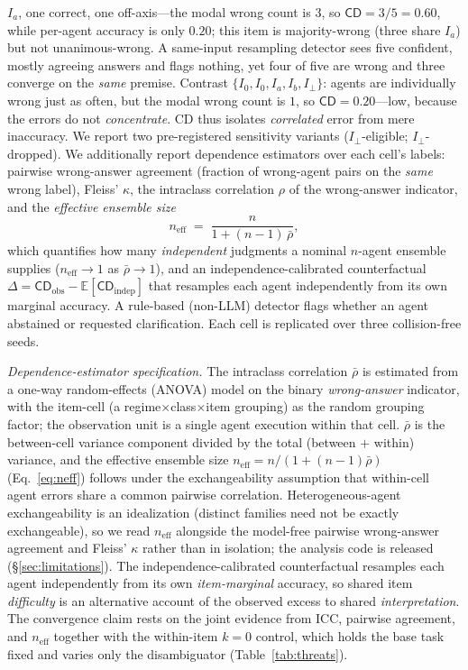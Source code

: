 \documentclass[acmsmall,screen,nonacm]{acmart}
\newcommand{\cd}{\textsf{CD}}
\newcommand{\iperp}{\ensuremath{I_\perp}}
\newcommand{\neff}{\ensuremath{n_{\mathrm{eff}}}}
\begin{document}
$I_a$, one correct, one off-axis---the modal wrong count is $3$, so $\cd = 3/5 = 0.60$, while per-agent
accuracy is only $0.20$; this item is majority-wrong (three share $I_a$) but not unanimous-wrong. A
same-input resampling detector sees five confident, mostly agreeing answers and flags nothing, yet four of
five are wrong and three converge on the \emph{same} premise. Contrast $\{I_0, I_0, I_a, I_b, \iperp\}$:
agents are individually wrong just as often, but the modal wrong count is $1$, so $\cd = 0.20$---low, because
the errors do not \emph{concentrate}. \cd{} thus isolates \emph{correlated} error from mere inaccuracy.
We report two
pre-registered sensitivity variants (\iperp{}-eligible; \iperp{}-dropped). We additionally report dependence
estimators over each cell's labels: pairwise wrong-answer agreement (fraction of wrong-agent pairs on the
\emph{same} wrong label), Fleiss' $\kappa$, the intraclass
correlation $\rho$ of the wrong-answer indicator, and the \emph{effective ensemble size}
\begin{equation}
\label{eq:neff}
\neff \;=\; \frac{n}{1+(n-1)\,\bar\rho},
\end{equation}
which quantifies how many \emph{independent} judgments a nominal $n$-agent ensemble supplies ($\neff\!\to\!1$
as $\bar\rho\!\to\!1$), and an independence-calibrated counterfactual $\Delta = \cd_{\mathrm{obs}} -
\mathbb{E}[\cd_{\mathrm{indep}}]$ that resamples each agent independently from its own marginal accuracy. A
rule-based (non-LLM) detector flags whether an agent abstained or requested clarification. Each cell is
replicated over three collision-free seeds.

\emph{Dependence-estimator specification.} The intraclass correlation $\bar\rho$ is estimated from a one-way
random-effects (ANOVA) model on the binary \emph{wrong-answer} indicator, with the item-cell (a
regime$\times$class$\times$item grouping) as the random grouping factor; the observation unit is a single
agent execution within that cell. $\bar\rho$ is the between-cell variance component divided by the total
(between $+$ within) variance, and the effective ensemble size $\neff=n/(1+(n-1)\bar\rho)$ (Eq.~\ref{eq:neff})
follows under the exchangeability assumption that within-cell agent errors share a common pairwise
correlation. Heterogeneous-agent exchangeability is an idealization (distinct families need not
be exactly exchangeable), so we read $\neff$ alongside the model-free pairwise wrong-answer agreement and
Fleiss' $\kappa$ rather than in isolation; the analysis code is released (\S\ref{sec:limitations}). The
independence-calibrated counterfactual resamples each agent independently from its own \emph{item-marginal}
accuracy, so shared item \emph{difficulty} is an alternative account of the observed excess to shared
\emph{interpretation}. The convergence claim rests on the joint evidence from ICC, pairwise agreement, and
$\neff$ together with the within-item $k{=}0$ control, which holds the base task fixed and varies only the
disambiguator (Table~\ref{tab:threats}).
\end{document}
